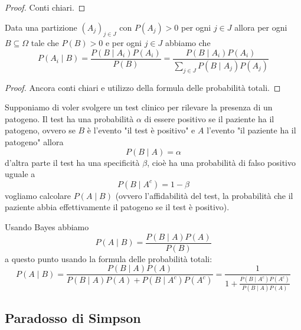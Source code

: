 \documentclass[11pt]{scrartcl}
\begin{document}
	\begin{proof}
		Conti chiari.
	\end{proof}
	\begin{theorem}[Bayes]
		Data una partizione $\left(A_j\right)_{j\in J}$ con $P(A_j)>0$ per ogni $j\in J$ allora per ogni $B\subseteq \Omega$ tale che $P(B)>0$ e per ogni $j\in J$ abbiamo che
		$$P(A_i\mid B)=\frac{P(B\mid A_i)P(A_i)}{P(B)}=\frac{P(B\mid A_i)P(A_i)}{\sum_{j\in J}P(B\mid A_j)P(A_j)}$$
	\end{theorem}
	\begin{proof}
		Ancora conti chiari e utilizzo della formula delle probabilità totali.
	\end{proof}
	\begin{example}
		Supponiamo di voler svolgere un test clinico per rilevare la presenza di un patogeno. Il test ha una probabilità $\alpha$ di essere positivo se il paziente ha il patogeno, ovvero se $B$ è l'evento "il test è positivo" e $A$ l'evento "il paziente ha il patogeno" allora
		$$P(B\mid A)=\alpha$$
		d'altra parte il test ha una specificità $\beta$, cioè ha una probabilità di falso positivo uguale a 
		$$P(B\mid A^c)=1-\beta$$
		vogliamo calcolare $P(A\mid B)$ (ovvero l'affidabilità del test, la probabilità che il paziente abbia effettivamente il patogeno se il test è positivo). 
	\end{example}
	\begin{answer}
		Usando Bayes abbiamo
		$$P(A\mid B)=\frac{P(B\mid A)P(A)}{P(B)}$$
		a questo punto usando la formula delle probabilità totali:
		$$P(A\mid B)=\frac{P(B\mid A)P(A)}{P(B\mid A)P(A)+P(B\mid A^c)P(A^c)}=\frac{1}{1+\frac{P(B\mid A^c)P(A^c)}{P(B\mid A)P(A)}}$$
	\end{answer}
	
	\subsection{Paradosso di Simpson}
	
\end{document}
